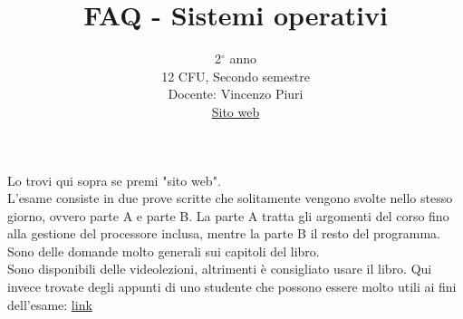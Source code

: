\documentclass{article}
\title{FAQ - \textbf{Sistemi operativi}}
\date{}
\author{
	2$^{\circ}$ anno\\12 CFU, Secondo semestre\\
	Docente: Vincenzo Piuri\\ 
	\href{https://vpiuriso.ariel.ctu.unimi.it/v5/home/Default.aspx}{Sito web}
}
\begin{document}
 
	\maketitle
	
	\begin{enumerate}
		
		\rmfamily
		Lo trovi qui sopra se premi "sito web".\\
		
		L'esame consiste in due prove scritte che solitamente vengono svolte nello stesso giorno, ovvero parte A e parte B.
		La parte A tratta gli argomenti del corso fino alla gestione del processore inclusa, mentre la parte B il resto
		del programma. Sono delle domande molto generali sui capitoli del libro.\\
		
		
		Sono disponibili delle videolezioni, altrimenti è consigliato usare il libro.
		Qui invece trovate degli appunti di uno studente che possono essere molto utili ai fini dell'esame: \href{http://www.swappa.it/wiki/Uni/SistemiOperativi}{link}\\
		
	\end{enumerate}
	
\end{document}
